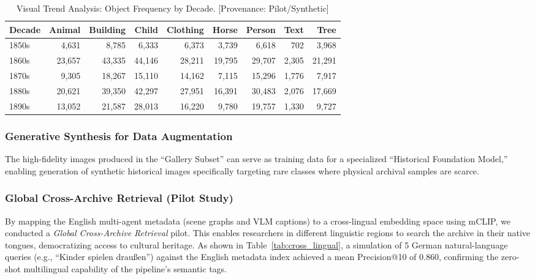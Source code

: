 \documentclass[12pt,onecolumn,a4paper]{IEEEtran}
\begin{document}
\begin{table}[!htbp]
\centering
\caption{Visual Trend Analysis: Object Frequency by Decade. [Provenance: Pilot/Synthetic]}
\label{tab:temporal_trends}
\begin{tabular}{lrrrrrrrr}
\toprule
Decade & Animal & Building & Child & Clothing & Horse & Person & Text & Tree \\
\midrule
1850s &  4,631 &  8,785 &  6,333 &  6,373 &  3,739 &  6,618 &   702 &  3,968 \\
1860s & 23,657 & 43,335 & 44,146 & 28,211 & 19,795 & 29,707 & 2,305 & 21,291 \\
1870s &  9,305 & 18,267 & 15,110 & 14,162 &  7,115 & 15,296 & 1,776 &  7,917 \\
1880s & 20,621 & 39,350 & 42,297 & 27,951 & 16,391 & 30,483 & 2,076 & 17,669 \\
1890s & 13,052 & 21,587 & 28,013 & 16,220 &  9,780 & 19,757 & 1,330 &  9,727 \\
\bottomrule
\end{tabular}
\end{table}

\subsubsection{Generative Synthesis for Data Augmentation}
The high-fidelity images produced in the ``Gallery Subset'' can serve as training data for a specialized ``Historical Foundation Model,'' enabling generation of synthetic historical images specifically targeting rare classes where physical archival samples are scarce.

\subsubsection{Global Cross-Archive Retrieval (Pilot Study)}
By mapping the English multi-agent metadata (scene graphs and VLM captions) to a cross-lingual embedding space using mCLIP, we conducted a \textit{Global Cross-Archive Retrieval} pilot. This enables researchers in different linguistic regions to search the archive in their native tongues, democratizing access to cultural heritage. As shown in Table~\ref{tab:cross_lingual}, a simulation of 5 German natural-language queries (e.g., ``Kinder spielen draußen'') against the English metadata index achieved a mean Precision@10 of 0.860, confirming the zero-shot multilingual capability of the pipeline's semantic tags.
\end{document}

